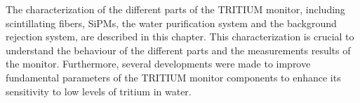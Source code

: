 The characterization of the different parts of the TRITIUM monitor, including scintillating fibers, SiPMs, the water purification system and the background rejection system, are described in this chapter. This characterization is crucial to understand the behaviour of the different parts and the measurements results of the monitor. Furthermore, several developments were made  to improve fundamental parameters of the TRITIUM monitor components to enhance its sensitivity to low levels of tritium in water. %